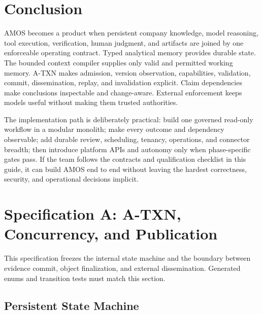 \documentclass[10pt]{article}
\newcommand{\amos}{\textsc{AMOS}\xspace}
\newcommand{\atxn}{\textsc{A-TXN}\xspace}
\begin{document}
\section{Conclusion}

\amos becomes a product when persistent company knowledge, model reasoning, tool execution, verification, human judgment, and artifacts are joined by one enforceable operating contract. Typed analytical memory provides durable state. The bounded context compiler supplies only valid and permitted working memory. \atxn makes admission, version observation, capabilities, validation, commit, dissemination, replay, and invalidation explicit. Claim dependencies make conclusions inspectable and change-aware. External enforcement keeps models useful without making them trusted authorities.

The implementation path is deliberately practical: build one governed read-only workflow in a modular monolith; make every outcome and dependency observable; add durable review, scheduling, tenancy, operations, and connector breadth; then introduce platform APIs and autonomy only when phase-specific gates pass. If the team follows the contracts and qualification checklist in this guide, it can build AMOS end to end without leaving the hardest correctness, security, and operational decisions implicit.

\clearpage
\appendix

\section{Specification A: A-TXN, Concurrency, and Publication}

This specification freezes the internal state machine and the boundary between evidence commit, object finalization, and external dissemination. Generated enums and transition tests must match this section.

\subsection{Persistent State Machine}
\end{document}
